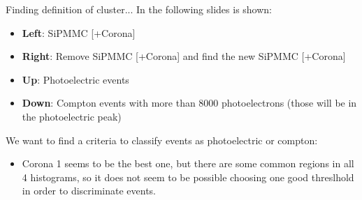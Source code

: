 \documentclass{beamer}
\begin{document}
\begin{frame}{Finding definition of cluster...}
In the following slides is shown:
\begin{itemize}
\item \textbf{Left}: SiPMMC [+Corona] 
\item \textbf{Right}: Remove SiPMMC [+Corona] and find the new SiPMMC [+Corona]
\item \textbf{Up}: Photoelectric events
\item \textbf{Down}: Compton events with more than 8000 photoelectrons (those will be in the photoelectric peak)
\end{itemize}
We want to find a criteria to classify events as photoelectric or compton:
\begin{itemize}
\item Corona 1 seems to be the best one, but there are some common regions in all 4 histograms, so it does not seem to be possible choosing one good threslhold in order to discriminate events.
\end{itemize}
\end{frame}
\end{document}
